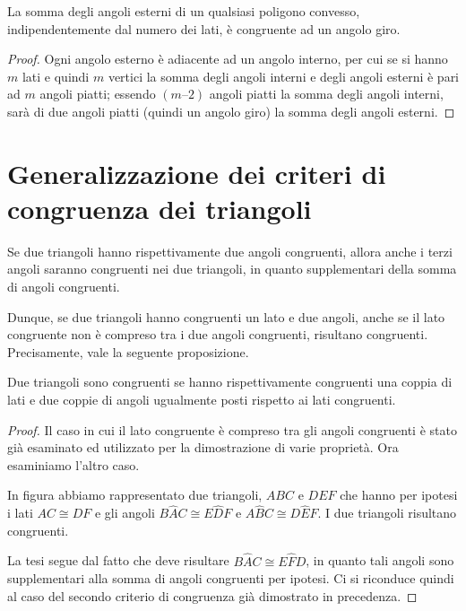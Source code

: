 \begin{teorema}
La somma degli angoli esterni di un qualsiasi poligono convesso, indipendentemente dal numero dei lati, è congruente ad un angolo giro.
\end{teorema}
\begin{proof}
Ogni angolo esterno è adiacente ad un angolo interno, per cui se si hanno $m$ lati e quindi $m$ vertici la somma degli angoli interni e degli angoli esterni è pari ad $m$ angoli piatti; essendo $(m – 2)$ angoli piatti la somma degli angoli interni, sarà di due angoli piatti (quindi un angolo giro) la somma degli angoli esterni.
\end{proof}


\section{Generalizzazione dei criteri di congruenza dei triangoli}

Se due triangoli hanno rispettivamente due angoli congruenti, allora anche i terzi angoli saranno congruenti nei due triangoli, in quanto supplementari della somma di angoli congruenti.

Dunque, se due triangoli hanno congruenti un lato e due angoli, anche se il lato congruente non è compreso tra i due angoli congruenti, risultano congruenti. Precisamente, vale la seguente proposizione.

\begin{teorema}
Due triangoli sono congruenti se hanno rispettivamente congruenti una coppia di lati e due coppie di angoli ugualmente posti rispetto ai lati congruenti.
\end{teorema}

\begin{proof}
Il caso in cui il lato congruente è compreso tra gli angoli congruenti è stato già esaminato ed utilizzato per la dimostrazione di varie proprietà. Ora esaminiamo l'altro caso.

In figura abbiamo rappresentato due triangoli, $ABC$ e $DEF$ che hanno per ipotesi i lati $AC\cong DF$ e gli angoli $B\widehat{A}C\cong E\widehat{D}F$ e $A\widehat{B}C\cong D\widehat{E}F$. I due triangoli risultano congruenti.

La tesi segue dal fatto che deve risultare $B\widehat{A}C\cong E\widehat{F}D$, in quanto tali angoli sono supplementari alla somma di angoli congruenti per ipotesi. Ci si riconduce quindi al caso del secondo criterio di congruenza già dimostrato in precedenza.
\end{proof}

